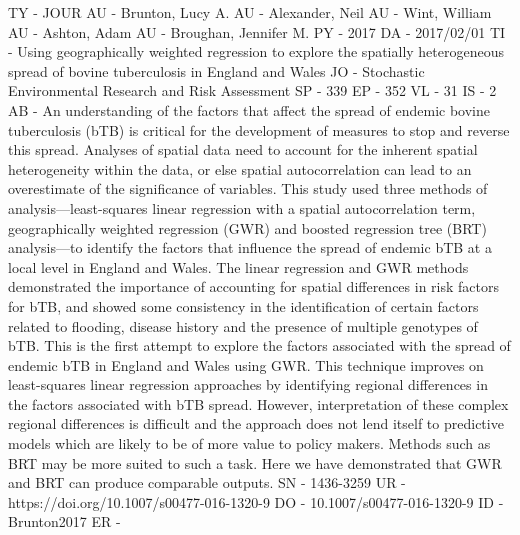TY  - JOUR
AU  - Brunton, Lucy A.
AU  - Alexander, Neil
AU  - Wint, William
AU  - Ashton, Adam
AU  - Broughan, Jennifer M.
PY  - 2017
DA  - 2017/02/01
TI  - Using geographically weighted regression to explore the spatially heterogeneous spread of bovine tuberculosis in England and Wales
JO  - Stochastic Environmental Research and Risk Assessment
SP  - 339
EP  - 352
VL  - 31
IS  - 2
AB  - An understanding of the factors that affect the spread of endemic bovine tuberculosis (bTB) is critical for the development of measures to stop and reverse this spread. Analyses of spatial data need to account for the inherent spatial heterogeneity within the data, or else spatial autocorrelation can lead to an overestimate of the significance of variables. This study used three methods of analysis—least-squares linear regression with a spatial autocorrelation term, geographically weighted regression (GWR) and boosted regression tree (BRT) analysis—to identify the factors that influence the spread of endemic bTB at a local level in England and Wales. The linear regression and GWR methods demonstrated the importance of accounting for spatial differences in risk factors for bTB, and showed some consistency in the identification of certain factors related to flooding, disease history and the presence of multiple genotypes of bTB. This is the first attempt to explore the factors associated with the spread of endemic bTB in England and Wales using GWR. This technique improves on least-squares linear regression approaches by identifying regional differences in the factors associated with bTB spread. However, interpretation of these complex regional differences is difficult and the approach does not lend itself to predictive models which are likely to be of more value to policy makers. Methods such as BRT may be more suited to such a task. Here we have demonstrated that GWR and BRT can produce comparable outputs.
SN  - 1436-3259
UR  - https://doi.org/10.1007/s00477-016-1320-9
DO  - 10.1007/s00477-016-1320-9
ID  - Brunton2017
ER  - 
